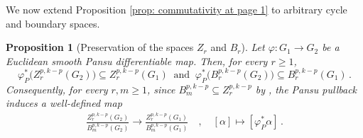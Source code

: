 \documentclass[dvipsnames]{amsart}
\newtheorem{proposition}[theorem]{Proposition}
\theoremstyle{definition}
\theoremstyle{definition}
\numberwithin{equation}{section}
\begin{document}
We now extend Proposition \ref{prop: commutativity at page 1} to arbitrary cycle and boundary spaces.

\begin{proposition}[Preservation of the spaces \(Z_r\) and \(B_r\)]
\label{prop:Pansu-preserves-Zr-Br}
Let \(\varphi:G_1\to G_2\) be a Euclidean smooth Pansu
differentiable map. Then, for every \(r\geq1\),
$$
\varphi_P^*
\bigl(Z_r^{p,k-p}(G_2)\bigr)
\subseteq
Z_r^{p,k-p}(G_1)
\ \text{ and }\ 
\varphi_P^*
\bigl(B_r^{p,k-p}(G_2)\bigr)
\subseteq
B_r^{p,k-p}(G_1)\,.
$$
Consequently, for every $r,m\ge 1$, since 
$B_m^{p,k-p}\subseteq Z_r^{p,k-p}$ by \cite[Lemma 4.1]{tripaldi2026spectralcomplexestruncatedmulticomplexes}, the Pansu pullback induces a
well-defined map
\begin{align}\label{eq: def pullback on quotients}
\frac{Z_r^{p,k-p}(G_2)}{B_m^{p,k-p}(G_2)}
\longrightarrow
\frac{Z_r^{p,k-p}(G_1)}{B_m^{p,k-p}(G_1)} \quad ,\quad 
[\alpha]
\mapsto
[\varphi_P^*\alpha]\,.
\end{align}
\end{proposition}
\end{document}
